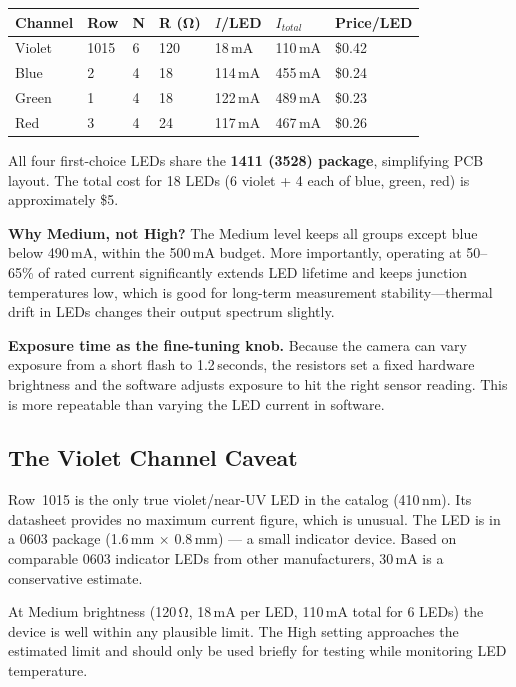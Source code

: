 \documentclass[12pt,letterpaper]{article}
\begin{document}
\begin{center}
\renewcommand{\arraystretch}{1.3}
\begin{tabular}{L{1.5cm} C{0.8cm} C{0.5cm} C{1.5cm} C{1.3cm} C{1.3cm} C{1.3cm}}
\toprule
\textbf{Channel} & \textbf{Row} & \textbf{N} & \textbf{R (\si{\ohm})} & $I$/LED & $I_{total}$ & \textbf{Price/LED} \\
\midrule
{} Violet & 1015 & 6 & 120 & 18\,mA & 110\,mA & \$0.42 \\
   Blue   & 2    & 4 & 18  & 114\,mA & 455\,mA & \$0.24 \\
  Green  & 1    & 4 & 18  & 122\,mA & 489\,mA & \$0.23 \\
    Red    & 3    & 4 & 24  & 117\,mA & 467\,mA & \$0.26 \\
\bottomrule
\end{tabular}
\end{center}

All four first-choice LEDs share the \textbf{1411 (3528) package}, simplifying PCB layout.
The total cost for 18 LEDs (6 violet + 4 each of blue, green, red) is approximately \$5.

\textbf{Why Medium, not High?} The Medium level keeps all groups except blue below 490\,mA,
within the 500\,mA budget. More importantly, operating at 50--65\% of rated current significantly
extends LED lifetime and keeps junction temperatures low, which is good for long-term
measurement stability---thermal drift in LEDs changes their output spectrum slightly.

\textbf{Exposure time as the fine-tuning knob.} Because the camera can vary exposure from
a short flash to 1.2\,seconds, the resistors set a fixed hardware brightness and the software
adjusts exposure to hit the right sensor reading. This is more repeatable than varying the LED
current in software.

\subsection{The Violet Channel Caveat}

Row~1015 is the only true violet/near-UV LED in the catalog (410\,nm). Its datasheet provides
no maximum current figure, which is unusual. The LED is in a 0603 package (1.6\,mm $\times$
0.8\,mm) --- a small indicator device. Based on comparable 0603 indicator LEDs from other
manufacturers, 30\,mA is a conservative estimate.

At Medium brightness (120\,\si{\ohm}, 18\,mA per LED, 110\,mA total for 6 LEDs) the device
is well within any plausible limit. The High setting approaches the estimated limit and should
only be used briefly for testing while monitoring LED temperature.
\end{document}
